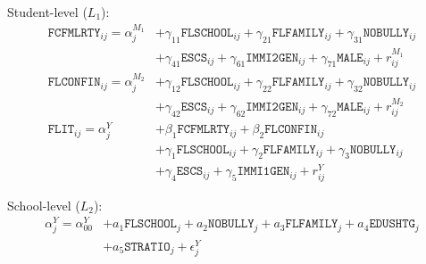 \documentclass[a4paper,11pt,UKenglish,twoside,openright]{report}\usepackage[]{graphicx}\usepackage[]{color}
\begin{document}
Student-level ($L_1$):
\begin{equation}
    \begin{aligned}
        \texttt{FCFMLRTY}_{ij} = \alpha^{M_1}_{j} &+ \gamma_{11}\texttt{FLSCHOOL}_{ij} + \gamma_{21}\texttt{FLFAMILY}_{ij} + \gamma_{31}\texttt{NOBULLY}_{ij}\\
        &+ \gamma_{41}\texttt{ESCS}_{ij} + \gamma_{61}\texttt{IMMI2GEN}_{ij} + \gamma_{71}\texttt{MALE}_{ij} + r^{M_1}_{ij}\\
        \texttt{FLCONFIN}_{ij} = \alpha^{M_2}_{j} &+ \gamma_{12}\texttt{FLSCHOOL}_{ij} + \gamma_{22}\texttt{FLFAMILY}_{ij} + \gamma_{32}\texttt{NOBULLY}_{ij}\\
        &+ \gamma_{42}\texttt{ESCS}_{ij} + \gamma_{62}\texttt{IMMI2GEN}_{ij} + \gamma_{72}\texttt{MALE}_{ij} + r^{M_2}_{ij}\\
        \texttt{FLIT}_{ij} = \alpha^{Y}_{j} &+ \beta_1\texttt{FCFMLRTY}_{ij} + \beta_2\texttt{FLCONFIN}_{ij}\\
        &+ \gamma_1\texttt{FLSCHOOL}_{ij} + \gamma_2\texttt{FLFAMILY}_{ij}+ \gamma_3\texttt{NOBULLY}_{ij} \\
        &+ \gamma_4\texttt{ESCS}_{ij} + \gamma_5\texttt{IMMI1GEN}_{ij} + r^{Y}_{ij}
    \end{aligned}
\end{equation}

School-level ($L_2$):
\begin{equation}
    \begin{aligned}
        \alpha^{Y}_{j} = \alpha^Y_{00} &+ a_1\texttt{FLSCHOOL}_j + a_2\texttt{NOBULLY}_j + a_3\texttt{FLFAMILY}_j + a_4\texttt{EDUSHTG}_j\\
        &+ a_5\texttt{STRATIO}_j + \epsilon^{Y}_j
    \end{aligned}
\end{equation}
\end{document}
